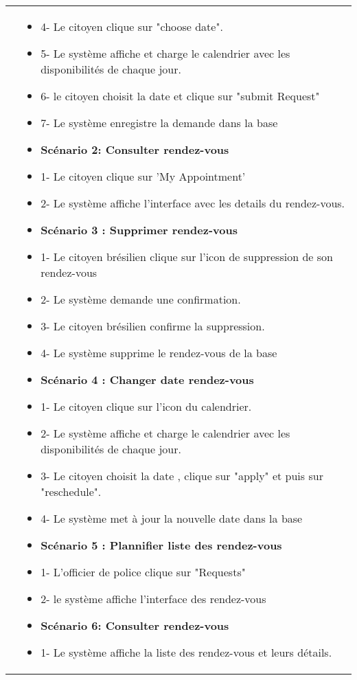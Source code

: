 \begin{longtable}{|>{\arraybackslash}p{4.2cm}|>{\arraybackslash}p{12.5cm}|}
\hline
\textbf{} &
    \begin{itemize}[label=]
    \item 4- Le citoyen clique sur "choose date".
    \item 5- Le système affiche et charge le calendrier avec les disponibilités de chaque jour.
    \item 6- le citoyen choisit la date et clique sur "submit Request"
    \item 7- Le système enregistre la demande dans la base
    \item\textbf{Scénario 2: Consulter rendez-vous }
    \item 1- Le citoyen clique sur 'My Appointment'
    \item 2- Le système affiche l'interface avec les details du rendez-vous.
    \item \textbf{Scénario 3 : Supprimer rendez-vous}
    \item 1- Le citoyen brésilien clique sur l'icon de suppression de son rendez-vous
    \item 2- Le système demande une confirmation.
    \item 3- Le citoyen brésilien confirme la suppression.
    \item 4- Le système supprime le rendez-vous de la base
    \item \textbf{Scénario 4 : Changer date rendez-vous}
    \item 1- Le citoyen clique sur l'icon du calendrier.
    \item 2- Le système affiche et charge le calendrier avec les disponibilités de chaque jour.
    \item 3- Le citoyen choisit la date , clique sur "apply" et puis sur "reschedule".
    \item 4- Le système met à jour la nouvelle date dans la base
    \item \textbf{Scénario 5 : Plannifier liste des rendez-vous}
    \item 1- L'officier de police clique sur "Requests"
    \item 2- le système affiche l'interface des rendez-vous
    \item\textbf{Scénario 6: Consulter rendez-vous }
    \item 1- Le système affiche la liste des rendez-vous et leurs détails.
\end{itemize} \\







\end{longtable}
